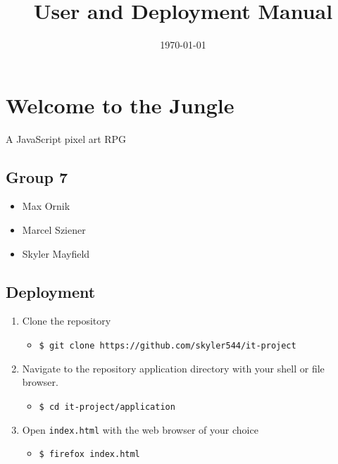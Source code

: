 \documentclass[11pt]{article}
\date{\today}
\title{User and Deployment Manual}
\begin{document}
\maketitle
\tableofcontents



\section{Welcome to the Jungle}
\label{sec:orga5c23e5}
A JavaScript pixel art RPG\\

\subsection{Group 7}
\label{sec:org471b77e}
\begin{itemize}
\item Max Ornik\\
\item Marcel Sziener\\
\item Skyler Mayfield\\
\end{itemize}

\subsection{Deployment}
\label{sec:org89bc380}
\begin{enumerate}
\item Clone the repository\\
\begin{itemize}
\item \texttt{\$ git clone https://github.com/skyler544/it-project}\\
\end{itemize}
\item Navigate to the repository application directory with your shell or file browser.\\
\begin{itemize}
\item \texttt{\$ cd it-project/application}\\
\end{itemize}
\item Open \texttt{index.html} with the web browser of your choice\\
\begin{itemize}
\item \texttt{\$ firefox index.html}\\
\end{itemize}
\end{enumerate}
\end{document}
